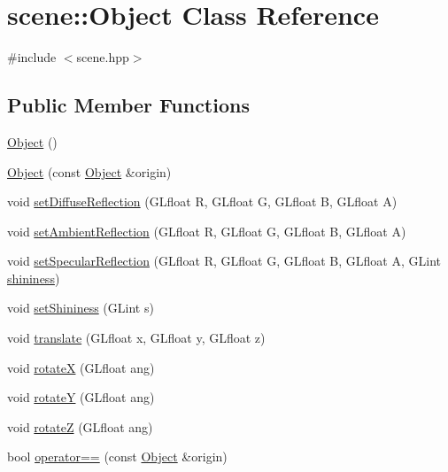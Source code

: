 \hypertarget{classscene_1_1_object}{}\section{scene\+:\+:Object Class Reference}
\label{classscene_1_1_object}


{\ttfamily \#include $<$scene.\+hpp$>$}

\subsection*{Public Member Functions}
\begin{DoxyCompactItemize}
\item 
\mbox{\hyperlink{classscene_1_1_object_abba9ed18d83499faa00c6692566d1099}{Object}} ()
\item 
\mbox{\hyperlink{classscene_1_1_object_a423efa99f61b720b2ad7636ef921c92a}{Object}} (const \mbox{\hyperlink{classscene_1_1_object}{Object}} \&origin)
\item 
void \mbox{\hyperlink{classscene_1_1_object_ae9b3a533a04879ff602a0139574a1eea}{set\+Diffuse\+Reflection}} (G\+Lfloat R, G\+Lfloat G, G\+Lfloat B, G\+Lfloat A)
\item 
void \mbox{\hyperlink{classscene_1_1_object_a45cfa429181c936f2a381b0da3918b2d}{set\+Ambient\+Reflection}} (G\+Lfloat R, G\+Lfloat G, G\+Lfloat B, G\+Lfloat A)
\item 
void \mbox{\hyperlink{classscene_1_1_object_accd3d5bdb1dd7f9578e867a85d1e81de}{set\+Specular\+Reflection}} (G\+Lfloat R, G\+Lfloat G, G\+Lfloat B, G\+Lfloat A, G\+Lint \mbox{\hyperlink{classscene_1_1_object_ad0d064fc3da95f59e0fea3a39122e9c5}{shininess}})
\item 
void \mbox{\hyperlink{classscene_1_1_object_a001cc633cf64c4fdda259e0a6ea68851}{set\+Shininess}} (G\+Lint s)
\item 
void \mbox{\hyperlink{classscene_1_1_object_a8b633a7d024f1fd0102e260570e0fbab}{translate}} (G\+Lfloat x, G\+Lfloat y, G\+Lfloat z)
\item 
void \mbox{\hyperlink{classscene_1_1_object_aa3bc78a375ed8cdcef344770f443ffbb}{rotateX}} (G\+Lfloat ang)
\item 
void \mbox{\hyperlink{classscene_1_1_object_a0fef8a3994b26cb027e9d50eb5baffb5}{rotateY}} (G\+Lfloat ang)
\item 
void \mbox{\hyperlink{classscene_1_1_object_a5ec5c22bd192f1f3009b059a8d64e5bd}{rotateZ}} (G\+Lfloat ang)
\item 
bool \mbox{\hyperlink{classscene_1_1_object_a09626943cc3ea30e4b2d446675ce7e7c}{operator==}} (const \mbox{\hyperlink{classscene_1_1_object}{Object}} \&origin)

\end{DoxyCompactItemize}
